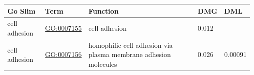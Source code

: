\documentclass[
]{article}
\begin{document}
\begin{longtable}[]{@{}lllll@{}}
\toprule
\begin{minipage}[b]{0.17\columnwidth}\raggedright
Go Slim\strut
\end{minipage} & \begin{minipage}[b]{0.17\columnwidth}\raggedright
Term\strut
\end{minipage} & \begin{minipage}[b]{0.17\columnwidth}\raggedright
Function\strut
\end{minipage} & \begin{minipage}[b]{0.17\columnwidth}\raggedright
DMG\strut
\end{minipage} & \begin{minipage}[b]{0.17\columnwidth}\raggedright
DML\strut
\end{minipage}\tabularnewline
\midrule
\endhead
\begin{minipage}[t]{0.17\columnwidth}\raggedright
cell adhesion\strut
\end{minipage} & \begin{minipage}[t]{0.17\columnwidth}\raggedright
\url{GO:0007155}\strut
\end{minipage} & \begin{minipage}[t]{0.17\columnwidth}\raggedright
cell adhesion\strut
\end{minipage} & \begin{minipage}[t]{0.17\columnwidth}\raggedright
0.012\strut
\end{minipage} & \begin{minipage}[t]{0.17\columnwidth}\raggedright
\strut
\end{minipage}\tabularnewline
\begin{minipage}[t]{0.17\columnwidth}\raggedright
cell adhesion\strut
\end{minipage} & \begin{minipage}[t]{0.17\columnwidth}\raggedright
\url{GO:0007156}\strut
\end{minipage} & \begin{minipage}[t]{0.17\columnwidth}\raggedright
homophilic cell adhesion via plasma membrane adhesion molecules\strut
\end{minipage} & \begin{minipage}[t]{0.17\columnwidth}\raggedright
0.026\strut
\end{minipage} & \begin{minipage}[t]{0.17\columnwidth}\raggedright
0.00091\strut
\end{minipage}\tabularnewline

\end{longtable}
\end{document}
